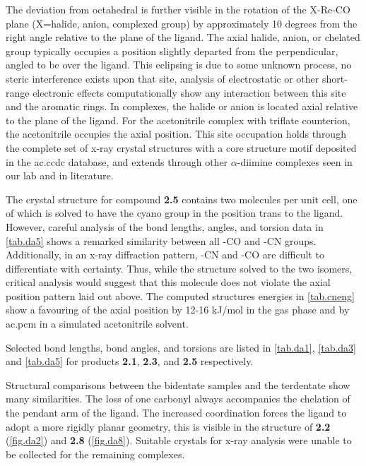The deviation from octahedral is further visible in the rotation of the X-Re-CO plane (X=halide, anion, complexed group) by approximately 10 degrees from the right angle relative to the plane of the ligand. The axial halide, anion, or chelated group typically occupies a position slightly departed from the perpendicular, angled to be over the ligand. This eclipsing is due to some unknown process, no steric interference exists upon that site, analysis of electrostatic or other short-range electronic effects computationally show any interaction between this site and the aromatic rings. In  complexes, the halide or anion is located axial relative to the plane of the ligand. For the acetonitrile complex with triflate counterion, the acetonitrile occupies the axial position. This site occupation holds through the complete set of x-ray crystal structures with a  core structure motif deposited in the \gls{ac.ccdc} database\autocite{allen2002}, and extends through other $\alpha$-diimine complexes seen in our lab and in literature\autocite{jurca2013}. 



The crystal structure for compound \textbf{2.5} contains two molecules per unit cell, one of which is solved to have the cyano group in the position trans to the ligand. However, careful analysis of the bond lengths, angles, and torsion data in \autoref{tab.da5} shows a remarked similarity between all -CO and -CN groups. Additionally, in an x-ray diffraction pattern, -CN and -CO are difficult to differentiate with certainty. Thus, while the structure solved to the two isomers, critical analysis would suggest that this molecule does not violate the axial position pattern laid out above. The computed structures energies in \autoref{tab.cneng} show a favouring of the axial position by 12-16 kJ/mol in the gas phase and by \gls{ac.pcm} in a simulated acetonitrile solvent. 

Selected bond lengths, bond angles, and torsions are listed in \autoref{tab.da1}, \autoref{tab.da3} and \autoref{tab.da5} for products \textbf{2.1}, \textbf{2.3}, and \textbf{2.5} respectively.





\FloatBarrier

Structural comparisons between the bidentate samples and the terdentate show many similarities. The loss of one carbonyl always accompanies the chelation of the pendant arm of the ligand. The increased coordination forces the ligand to adopt a more rigidly planar geometry, this is visible in the structure of \textbf{2.2} (\autoref{fig.da2}) and \textbf{2.8} (\autoref{fig.da8}). Suitable crystals for x-ray analysis were unable to be collected for the remaining complexes.

